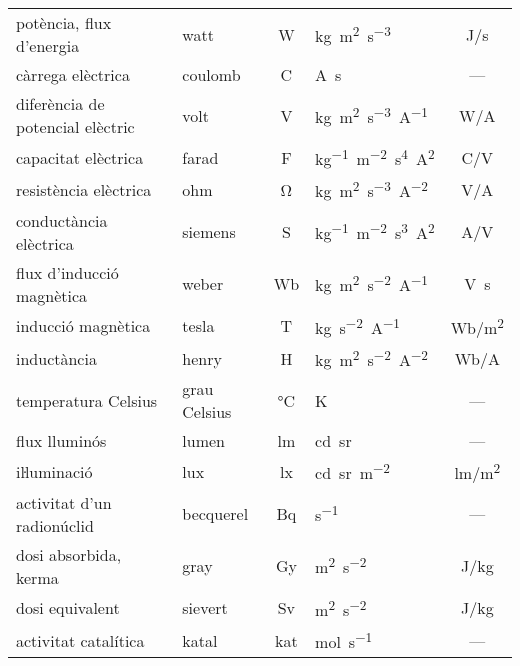 \begin{ThreePartTable}
\begin{longtable}[h]{llclc}
   potència, flux d'energia & watt & W & \unit{kg.m^2.s^{-3}}  & \unit{J/s}\\
   càrrega elèctrica & coulomb & C  & \unit{A.s} &  ---\\
   diferència de potencial elèctric & volt & V & \unit{kg.m^2.s^{-3}.A^{-1}}  & \unit{W/A}\\
   capacitat elèctrica & farad & F   & \unit{kg^{-1}.m^{-2}.s^4.A^2}& \unit{C/V}\\
   resistència elèctrica & ohm &  \unit{\ohm}  & \unit{kg.m^2.s^{-3}.A^{-2}} & \unit{V/A}\\
   conductància elèctrica & siemens &  S  & \unit{kg^{-1}.m^{-2}.s^3.A^2} & \unit{A/V}\\
   flux d'inducció magnètica & weber &  Wb  & \unit{kg.m^2.s^{-2}.A^{-1}} & \unit{V.s}\\
   inducció magnètica & tesla &  T  & \unit{kg.s^{-2}.A^{-1}} & \unit{Wb/m^2}\\
   inductància & henry &  H  & \unit{kg.m^2.s^{-2}.A^{-2}} & \unit{Wb/A}\\
   temperatura Celsius & grau Celsius &  \unit{\degreeCelsius} & \unit{K} & --- \\
   flux lluminós & lumen & lm  & \unit{cd.sr}& ---\\
   iŀluminació & lux & lx & \unit{cd.sr.m^{-2}} & \unit{lm/m^2} \\
   activitat  d'un radionúclid & becquerel & Bq& \unit{s^{-1}} & --- \\
   dosi absorbida, kerma\tnote{\color{blue}(c)} & gray & Gy  & \unit{m^2.s^{-2}}& \unit{J/kg}\\
   dosi equivalent & sievert & Sv  & \unit{m^2.s^{-2}}& \unit{J/kg}\\
   activitat catalítica & katal & kat & \unit{mol.s^{-1}} & ---\\
   \bottomrule[1pt]
\end{longtable}
\end{ThreePartTable}
       
   
    
   
   
   
   
    
 
   
  
   
     
\index{\unit{\ohm}}    
\index{\unit{\degreeCelsius}}    

